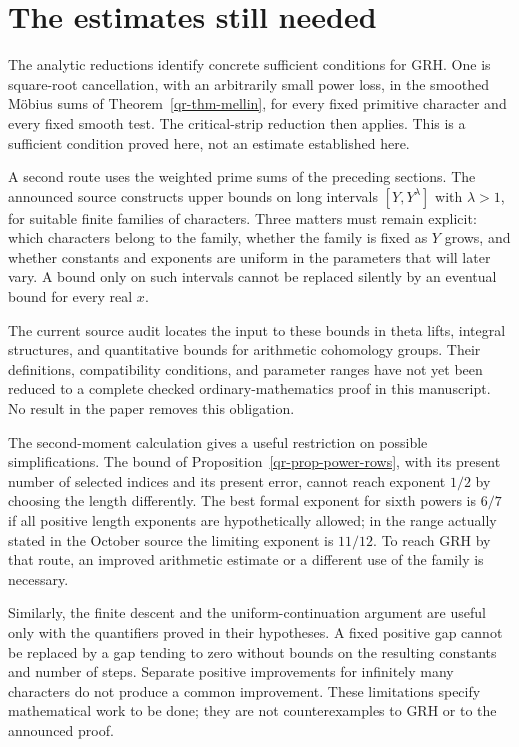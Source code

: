 \section{The estimates still needed}
\label{sec:remaining-estimates}

The analytic reductions identify concrete sufficient conditions for GRH.
One is square-root cancellation, with an arbitrarily small power loss,
in the smoothed M\"obius sums of
Theorem~\ref{qr-thm-mellin}, for every fixed primitive character and
every fixed smooth test. The critical-strip reduction then applies.
This is a sufficient condition proved here, not an estimate established
here.

A second route uses the weighted prime sums of the preceding sections.
The announced source constructs upper bounds on long intervals
$[Y,Y^{\lambda}]$ with $\lambda>1$, for suitable finite families of
characters. Three matters must remain explicit: which characters
belong to the family, whether the family is fixed as $Y$ grows, and
whether constants and exponents are uniform in the parameters that
will later vary. A bound only on such intervals cannot be replaced
silently by an eventual bound for every real $x$.

The current source audit locates the input to these bounds in theta
lifts, integral structures, and quantitative bounds for arithmetic
cohomology groups. Their definitions, compatibility conditions, and
parameter ranges have not yet been reduced to a complete checked
ordinary-mathematics proof in this manuscript. No result in the paper
removes this obligation.

The second-moment calculation gives a useful restriction on possible
simplifications. The bound of Proposition~\ref{qr-prop-power-rows},
with its present number of selected indices and its present error,
cannot reach exponent $1/2$ by choosing the length differently.
The best formal exponent for sixth powers is $6/7$ if all positive
length exponents are hypothetically allowed; in the range actually
stated in the October source the limiting exponent is $11/12$.
To reach GRH by that route, an improved arithmetic estimate or a
different use of the family is necessary.

Similarly, the finite descent and the uniform-continuation argument
are useful only with the quantifiers proved in their hypotheses.
A fixed positive gap cannot be replaced by a gap tending to zero
without bounds on the resulting constants and number of steps.
Separate positive improvements for infinitely many characters do not
produce a common improvement. These limitations specify mathematical
work to be done; they are not counterexamples to GRH or to the
announced proof.
